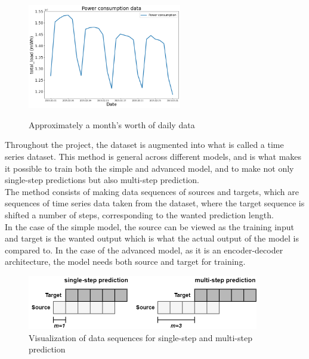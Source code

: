 \documentclass[main.tex]{subfiles}
\begin{document}
\begin{figure}[H]
\centering
\includegraphics[width=0.6\textwidth]{GeneralPlots/powerdata2.png}
\label{fig:daily_plot}
\caption{Approximately a month's worth of daily data}
\end{figure}

Throughout the project, the dataset is augmented into what is called a time series dataset. This method is general across different models, and is what makes it possible to train both the simple and advanced model, and to make not only single-step predictions but also multi-step prediction.\\
The method consists of making data sequences of sources and targets, which are sequences of time series data taken from the dataset, where the target sequence is shifted a number of steps, corresponding to the wanted prediction length.\\
In the case of the simple model, the source can be viewed as the training input and target is the wanted output which is what the actual output of the model is compared to. In the case of the advanced model, as it is an encoder-decoder architecture, the model needs both source and target for training.
\begin{figure}[H]
    \centering
    \includegraphics[width=0.9\textwidth]{Figures/timeseriesfigure.png}
    \caption{Visualization of data sequences for single-step and multi-step prediction}
    \label{fig:timeseriesfigure}
\end{figure}
\end{document}
